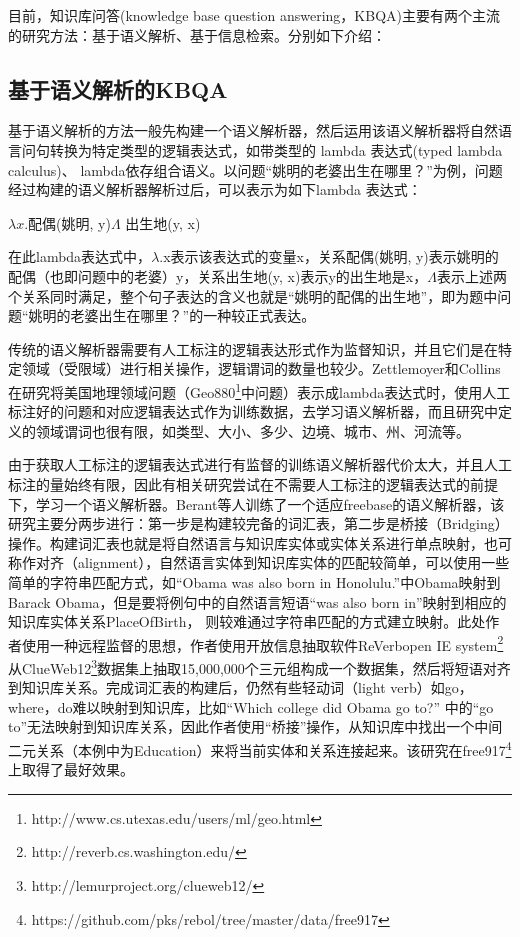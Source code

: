 目前，知识库问答(knowledge base question answering，KBQA)主要有两个主流的研究方法：基于语义解析、基于信息检索。分别如下介绍：

\subsection{基于语义解析的KBQA}
基于语义解析的方法一般先构建一个语义解析器，然后运用该语义解析器将自然语言问句转换为特定类型的逻辑表达式，如带类型的 lambda 表达式(typed lambda calculus)、 lambda依存组合语义。以问题“姚明的老婆出生在哪里？”为例，问题经过构建的语义解析器解析过后，可以表示为如下lambda 表达式：
\begin{center}
$\lambda x.$配偶(姚明, y)\space$\Lambda$ 出生地(y, x)
\end{center}

在此lambda表达式中，$\lambda$.x表示该表达式的变量x，关系配偶(姚明, y)表示姚明的配偶（也即问题中的老婆）y，关系出生地(y, x)表示y的出生地是x，$\Lambda$表示上述两个关系同时满足，整个句子表达的含义也就是“姚明的配偶的出生地”，即为题中问题“姚明的老婆出生在哪里？”的一种较正式表达。

传统的语义解析器需要有人工标注的逻辑表达形式作为监督知识，并且它们是在特定领域（受限域）进行相关操作，逻辑谓词的数量也较少\cite{Zettlemoyer}\cite{Wong}\cite{Kwiatkowski}。Zettlemoyer和Collins在研究将美国地理领域问题（Geo880\footnote{http://www.cs.utexas.edu/users/ml/geo.html}中问题）表示成lambda表达式时，使用人工标注好的问题和对应逻辑表达式作为训练数据，去学习语义解析器，而且研究中定义的领域谓词也很有限，如类型、大小、多少、边境、城市、州、河流等。

由于获取人工标注的逻辑表达式进行有监督的训练语义解析器代价太大，并且人工标注的量始终有限，因此有相关研究尝试在不需要人工标注的逻辑表达式的前提下，学习一个语义解析器。Berant\cite{BerantCF}等人训练了一个适应freebase的语义解析器，该研究主要分两步进行：第一步是构建较完备的词汇表，第二步是桥接（Bridging）操作。构建词汇表也就是将自然语言与知识库实体或实体关系进行单点映射，也可称作对齐（alignment），自然语言实体到知识库实体的匹配较简单，可以使用一些简单的字符串匹配方式，如“Obama was also born in Honolulu.”中Obama映射到Barack Obama，但是要将例句中的自然语言短语“was also born in”映射到相应的知识库实体关系PlaceOfBirth， 则较难通过字符串匹配的方式建立映射。此处作者使用一种远程监督的思想，作者使用开放信息抽取软件ReVerbopen IE system\footnote{http://reverb.cs.washington.edu/}从ClueWeb12\footnote{http://lemurproject.org/clueweb12/}数据集上抽取15,000,000个三元组构成一个数据集，然后将短语对齐到知识库关系。完成词汇表的构建后，仍然有些轻动词（light verb）如go，where，do难以映射到知识库，比如“Which college did Obama go to?” 中的“go to”无法映射到知识库关系，因此作者使用“桥接”操作，从知识库中找出一个中间二元关系（本例中为Education）来将当前实体和关系连接起来。该研究在free917\footnote{https://github.com/pks/rebol/tree/master/data/free917}上取得了最好效果。

